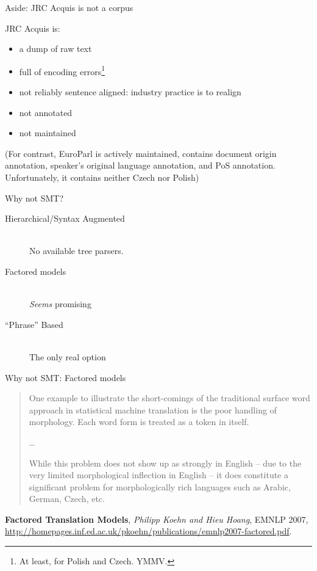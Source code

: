 \documentclass{beamer}
\begin{document}
\begin{frame}{Aside: JRC Acquis is not a corpus}

JRC Acquis is:

\begin{itemize}
\item a dump of raw text
\item full of encoding errors\footnote{At least, for Polish and Czech. YMMV.}
\item not reliably sentence aligned: industry practice is to realign
\item not annotated
\item not maintained
\end{itemize}

{\footnotesize (For contrast, EuroParl is actively maintained, contains document origin annotation, 
speaker's original language annotation, and PoS annotation. Unfortunately, it contains
neither Czech nor Polish)}
\end{frame}
\begin{frame}{Why not SMT?}
\begin{description}
  \item[Hierarchical/Syntax Augmented] \hfill \\
  No available tree parsers.
  \item[Factored models] \hfill \\
  {\em Seems} promising
  \item[``Phrase'' Based] \hfill \\
  The only real option
\end{description}
\end{frame}

\begin{frame}{Why not SMT: Factored models}

\begin{quote}
One example to illustrate the short-comings of the
traditional surface word approach in statistical machine
translation is the poor handling of morphology.
Each word form is treated as a token in itself.

\ldots

While this problem does not show up as strongly
in English -- due to the very limited morphological
inflection in English -- it does constitute a significant
problem for morphologically rich languages
such as Arabic, German, Czech, etc.
\end{quote}

{\footnotesize
\textbf{Factored Translation Models}, {\em Philipp Koehn and Hieu Hoang}, EMNLP 2007, 
\url{http://homepages.inf.ed.ac.uk/pkoehn/publications/emnlp2007-factored.pdf}.}
\end{frame}
\end{document}
